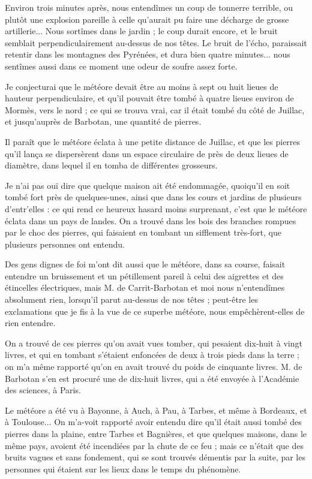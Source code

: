\documentclass[a4paper, 12pt, oneside, french]{article}
\begin{document}
\og Environ trois minutes après, nous entendîmes un coup de tonnerre terrible, ou plutôt une explosion pareille à celle qu'aurait pu faire une décharge de grosse artillerie... Nous sortîmes dans le jardin ; le coup durait encore, et le bruit semblait perpendiculairement au-dessus de nos têtes. Le bruit de l'écho, paraissait retentir dans les montagnes des Pyrénées, et dura bien quatre minutes... nous sentîmes aussi dans ce moment une odeur de soufre assez forte. \fg

\og Je conjecturai que le météore devait être au moins à sept ou huit lieues de hauteur perpendiculaire, et qu'il pouvait être tombé à quatre lieues environ de Mormès, vers le nord ; ce qui se trouva vrai, car il était tombé du côté de Juillac, et jusqu'auprès de Barbotan, une quantité de pierres. \fg

\og Il paraît que le météore éclata à une petite distance de Juillac, et que les pierres qu'il lança se dispersèrent dans un espace circulaire de près de deux lieues de diamètre, dans lequel il en tomba de différentes grosseurs. \fg

\og Je n'ai pas ouï dire que quelque maison ait été endommagée, quoiqu'il en soit tombé fort près de quelques-unes, ainsi que dans les cours et jardins de plusieurs d'entr'elles : ce qui rend ce heureux hasard moins surprenant, c'est que le météore éclata dans un pays de landes. On a trouvé dans les bois des branches rompues par le choc des pierres, qui faisaient en tombant un sifflement très-fort, que plusieurs personnes ont entendu. \fg

\og Des gens dignes de foi m'ont dit aussi que le météore, dans sa course, faisait entendre un bruissement et un pétillement pareil à celui des aigrettes et des étincelles électriques, mais M. de Carrit-Barbotan et moi nous n'entendîmes absolument rien, lorsqu'il parut au-dessus de nos têtes ; peut-être les exclamations que je fis à la vue de ce superbe météore, nous empêchèrent-elles de rien entendre. \fg

\og On a trouvé de ces pierres qu'on avait vues tomber, qui pesaient dix-huit à vingt livres, et qui en tombant s'étaient enfoncées de deux à trois pieds dans la terre ; on m'a même rapporté qu'on en avait trouvé du poids de cinquante livres. M. de Barbotan s'en est procuré une de dix-huit livres, qui a été envoyée à l'Académie des sciences, à Paris. \fg

\og Le météore a été vu à Bayonne, à Auch, à Pau, à Tarbes, et même à Bordeaux, et à Toulouse... On m'a-voit rapporté avoir entendu dire qu'il était aussi tombé des pierres dans la plaine, entre Tarbes et Bagnières, et que quelques maisons, dans le même pays, avoient été incendiées par la chute de ce feu ; mais ce n'était que des bruits vagues et sans fondement, qui se sont trouvés démentis par la suite, par les personnes qui étaient sur les lieux dans le temps du phénomène. \fg
\end{document}
